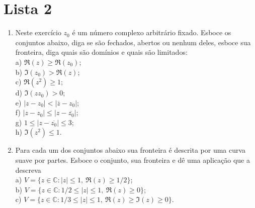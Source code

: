 \chapter*{Lista 2}



\begin{enumerate}[leftmargin=*]
	\item Neste exercício $z_0$ é um número complexo arbitrário fixado. 
	Esboce os conjuntos abaixo, diga se são fechados, abertos
	ou nenhum deles, esboce sua fronteira, diga quais são domínios e quais são limitados:
	\\
	a) $\Re(z)\geq \Re(z_0)$;\\
	b) $\Im(z_0)> \Re(z)$;\\
	c) $\Re(z^2)\geq 1$;\\
	d) $\Im(zz_0)>0$;\\
	e) $|z-z_0|<|\overline{z}-z_0|$;\\
	f) $|z-z_0|\leq |z-\overline{z_0}|$;\\
	g) $1\leq |z-\overline{z_0}|\leq 3$;\\
	h) $\Im(z^2)\leq 1$.
	\item Para cada um dos conjuntos abaixo sua fronteira é descrita 
	por uma curva suave por partes. Esboce o conjunto, sua fronteira e dê uma aplicação que a descreva\\
	a) $V=\{z\in\mathbb{C}: |z|\leq 1,\ \Re(z)\geq 1/2\}$;\\
	b) $V=\{z\in\mathbb{C}: 1/2\leq |z|\leq 1, \ \Re(z)\geq 0\}$;\\
	c) $V=\{z\in\mathbb{C}: 1/3\leq |z|\leq 1,\  \Re(z)\geq \Im(z)\geq 0\}$.
	
\end{enumerate}